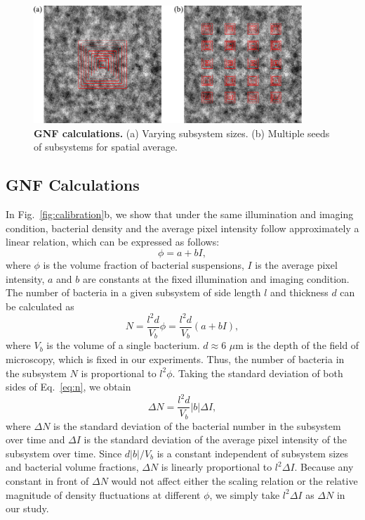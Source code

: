 \begin{figure}[ht]
\begin{center}
\includegraphics[width=0.9\textwidth]{figs/5-GNF/GNF-calculations.pdf}
\caption[GNF Calculations]
{
\textbf{GNF calculations.}
(a) Varying subsystem sizes.
(b) Multiple seeds of subsystems for spatial average.
}
\label{GNF-calculation}
\end{center}
\end{figure}

\subsection{GNF Calculations}
In Fig.~\ref{fig:calibration}b, we show that under the same illumination and imaging condition, bacterial density and the average pixel intensity follow approximately a linear relation, which can be expressed as follows:
\begin{equation}
\label{eq:phi-I-relation}
\phi = a + bI,
\end{equation}
where $\phi$ is the volume fraction of bacterial suspensions, $I$ is the average pixel intensity, $a$ and $b$ are constants at the fixed illumination and imaging condition. The number of bacteria in a given subsystem of side length $l$ and thickness $d$ can be calculated as
\begin{equation}
\label{eq:n}
N = \frac{l^2d}{V_b} \phi = \frac{l^2d}{V_b} (a+bI),
\end{equation}
where $V_b$ is the volume of a single bacterium. $d \approx 6$ $\mu$m is the depth of the field of microscopy, which is fixed in our experiments. Thus, the number of bacteria in the subsystem $N$ is proportional to $l^2 \phi$. Taking the standard deviation of both sides of Eq.~\ref{eq:n}, we obtain
\begin{equation}
\label{intensity-number}
\Delta N = \frac{l^2 d}{V_b}|b|\Delta I,
\end{equation}
where $\Delta N$ is the standard deviation of the bacterial number in the subsystem over time and $\Delta I$ is the standard deviation of the average pixel intensity of the subsystem over time. Since $d|b|/V_b$ is a constant independent of subsystem sizes and bacterial volume fractions, $\Delta N$ is linearly proportional to $l^2\Delta I$. Because any constant in front of $\Delta N$ would not affect either the scaling relation or the relative magnitude of density fluctuations at different $\phi$, we simply take $l^2\Delta I$ as $\Delta N$ in our study.

